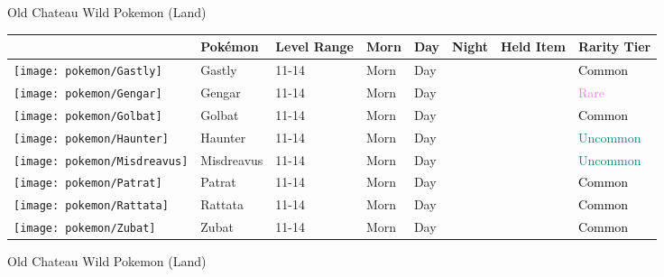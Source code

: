 \caption{Old Chateau Wild Pokemon (Land)}%
\begin{longtable}{||l l l l l l l l||}%
\hline%
&Pokémon&Level Range&Morn&Day&Night&Held Item&Rarity Tier\\%
\hline%
\endhead%
\hline%
\texttt{[image: pokemon/Gastly]}&Gastly&11{-}14&Morn&Day&&&\textcolor{black}{%
Common%
}\\%
\hline%
\texttt{[image: pokemon/Gengar]}&Gengar&11{-}14&Morn&Day&&&\textcolor{violet}{%
Rare%
}\\%
\hline%
\texttt{[image: pokemon/Golbat]}&Golbat&11{-}14&Morn&Day&&&\textcolor{black}{%
Common%
}\\%
\hline%
\texttt{[image: pokemon/Haunter]}&Haunter&11{-}14&Morn&Day&&&\textcolor{teal}{%
Uncommon%
}\\%
\hline%
\texttt{[image: pokemon/Misdreavus]}&Misdreavus&11{-}14&Morn&Day&&&\textcolor{teal}{%
Uncommon%
}\\%
\hline%
\texttt{[image: pokemon/Patrat]}&Patrat&11{-}14&Morn&Day&&&\textcolor{black}{%
Common%
}\\%
\hline%
\texttt{[image: pokemon/Rattata]}&Rattata&11{-}14&Morn&Day&&&\textcolor{black}{%
Common%
}\\%
\hline%
\texttt{[image: pokemon/Zubat]}&Zubat&11{-}14&Morn&Day&&&\textcolor{black}{%
Common%
}\\%
\hline%
\end{longtable}%
\caption{Old Chateau Wild Pokemon (Land)}